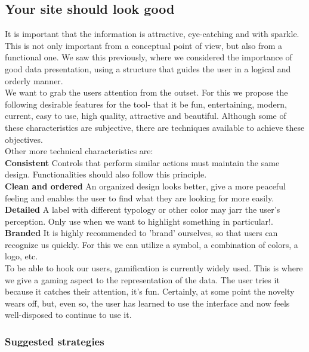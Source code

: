 \subsection{Your site should look good}

It is important that the information is attractive, eye-catching and with sparkle. This is not only important from a conceptual point of view, but also from a functional one. We saw this previously, where we considered the importance
of good data presentation, using a structure that guides the user in a logical and orderly manner.\\

We want to grab the users attention from the outset. For this we propose the following desirable features for the tool- that it be fun, entertaining,
modern, current, easy to use, high quality, attractive and beautiful. Although some of these characteristics are subjective, there are techniques available to achieve these objectives.\\

Other more technical characteristics are: \\

\textbf{Consistent} Controls that perform similar actions must maintain the same design. Functionalities
should also follow this principle. \\

\textbf{Clean and ordered} An organized design looks better, give a more peaceful feeling and enables the user to find what they are looking for
more easily.\\

\textbf{Detailed} A label with different typology or other color may jarr the user's perception. Only use when
we want to highlight something in particular!. \\

\textbf{Branded} It is highly recommended to 'brand' ourselves, so that users can recognize us quickly. For this we can utilize a symbol, a combination of colors, a logo, etc.\\

To be able to hook our users, gamification is currently widely used. This is where we give a gaming aspect to the representation of the data. The user tries it because it catches their attention, it's fun.
Certainly, at some point the novelty wears off, but, even so, the user has learned to use the interface and now feels well-disposed to continue to use it.

\subsubsection*{Suggested strategies}

